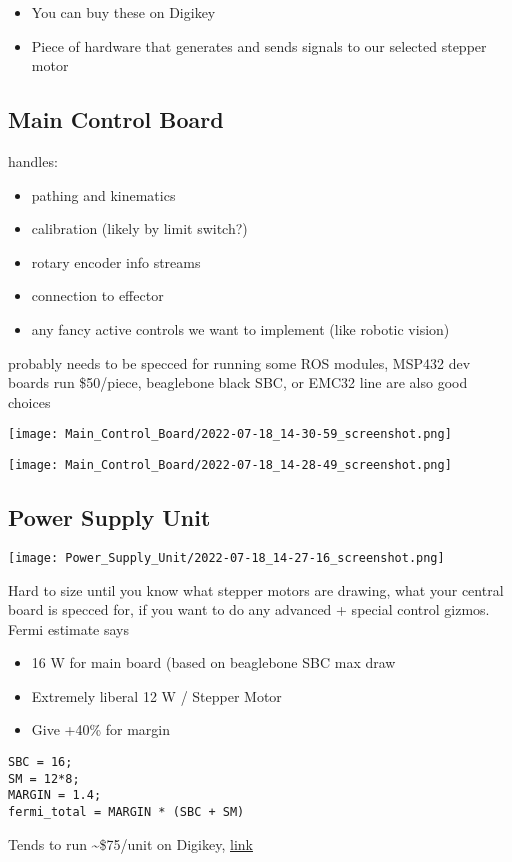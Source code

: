\documentclass[11pt]{article}
\begin{document}
\begin{itemize}
\item You can buy these on Digikey
\item Piece of hardware that generates and sends signals to our selected stepper motor
\end{itemize}

\subsection{Main Control Board}
\label{sec:org6d42eff}
handles:
\begin{itemize}
\item pathing and kinematics
\item calibration (likely by limit switch?)
\item rotary encoder info streams
\item connection to effector
\item any fancy active controls we want to implement (like robotic vision)
\end{itemize}
probably needs to be specced for running some ROS modules, MSP432 dev boards run \$50/piece, beaglebone black SBC, or EMC32 line are also good choices
\begin{center}
\texttt{[image: Main\_Control\_Board/2022-07-18\_14-30-59\_screenshot.png]}
\end{center}
\begin{center}
\texttt{[image: Main\_Control\_Board/2022-07-18\_14-28-49\_screenshot.png]}
\end{center}

\subsection{Power Supply Unit}
\label{sec:orgcd363eb}
\begin{center}
\texttt{[image: Power\_Supply\_Unit/2022-07-18\_14-27-16\_screenshot.png]}
\end{center}
Hard to size until you know what stepper motors are drawing, what your central board is specced for, if you want to do any advanced + special control gizmos. Fermi estimate says
\begin{itemize}
\item 16 W for main board (based on beaglebone SBC max draw
\item Extremely liberal 12 W / Stepper Motor
\item Give +40\% for margin
\end{itemize}
\begin{verbatim}
SBC = 16;
SM = 12*8;
MARGIN = 1.4;
fermi_total = MARGIN * (SBC + SM)
\end{verbatim}
Tends to run \textasciitilde{}\$75/unit on Digikey, \href{https://www.digikey.com/en/products/detail/traco-power/TXLN-150-124/13681763}{link}
\end{document}
